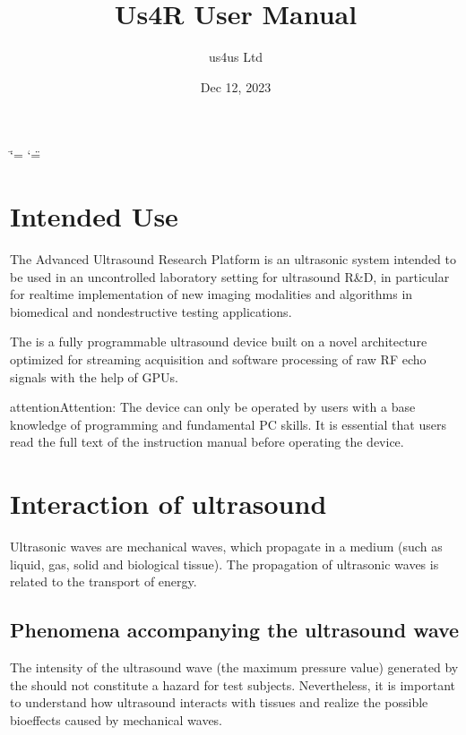 \documentclass[letterpaper,10pt,english]{sphinxmanual}
\title{Us4R User Manual}
\date{Dec 12, 2023}
\author{us4us Ltd}
\begin{document}
\ifdefined\shorthandoff
  \ifnum\catcode`\=\string=\active\shorthandoff{=}\fi
  \ifnum\catcode`\"=\active{}\fi
\fi

\pagestyle{empty}
\sphinxmaketitle
\pagestyle{plain}
\sphinxtableofcontents
\pagestyle{normal}
\label{\detokenize{index::doc}}


\sphinxstepscope


\chapter{Intended Use}
\label{\detokenize{content/intro:intended-use}}\label{\detokenize{content/intro::doc}}
\sphinxAtStartPar
The Advanced Ultrasound Research Platform  is an ultrasonic
system intended to be used in an uncontrolled laboratory setting for
ultrasound R\&D, in particular for real\sphinxhyphen{}time implementation of new
imaging modalities and algorithms in biomedical and non\sphinxhyphen{}destructive
testing applications. 

\sphinxAtStartPar
The  is a fully programmable ultrasound device built on a novel
architecture optimized for streaming acquisition and software processing
of raw RF echo signals with the help of GPUs.

\begin{sphinxadmonition}{attention}{Attention:}
\sphinxAtStartPar
The device can only be operated by users with a base knowledge of programming and fundamental PC skills. It is essential that users read the full text of the instruction manual before operating the device.
\end{sphinxadmonition}


\chapter{Interaction of ultrasound}
\label{\detokenize{content/intro:interaction-of-ultrasound}}
\sphinxAtStartPar
Ultrasonic waves are mechanical waves, which propagate in a medium (such
as liquid, gas, solid and biological tissue). The propagation of
ultrasonic waves is related to the transport of energy.


\section{Phenomena accompanying the ultrasound wave}
\label{\detokenize{content/intro:phenomena-accompanying-the-ultrasound-wave}}
\sphinxAtStartPar
The intensity of the ultrasound wave (the maximum pressure value)
generated by the  should not constitute a hazard for test
subjects. Nevertheless, it is important to understand how ultrasound
interacts with tissues and realize the possible bioeffects caused by
mechanical waves.
\end{document}
